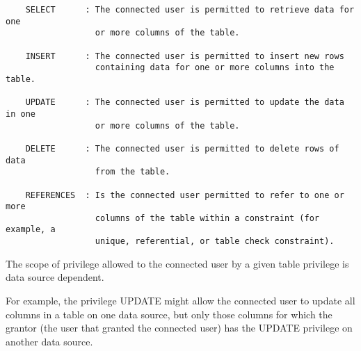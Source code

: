 \begin{verbatim}
    SELECT      : The connected user is permitted to retrieve data for one 
                  or more columns of the table.

    INSERT      : The connected user is permitted to insert new rows 
                  containing data for one or more columns into the table.

    UPDATE      : The connected user is permitted to update the data in one 
                  or more columns of the table.

    DELETE      : The connected user is permitted to delete rows of data 
                  from the table.

    REFERENCES  : Is the connected user permitted to refer to one or more 
                  columns of the table within a constraint (for example, a 
                  unique, referential, or table check constraint).
\end{verbatim}


The scope of privilege allowed to the connected user by a given table 
privilege is data source dependent. 

For example, the privilege UPDATE might allow the connected user to update 
all columns in a table on one data source, but only those columns for 
which the grantor (the user that granted the connected user) has the UPDATE 
privilege on another data source.


\label{wxdbtranslatesqlstate}





